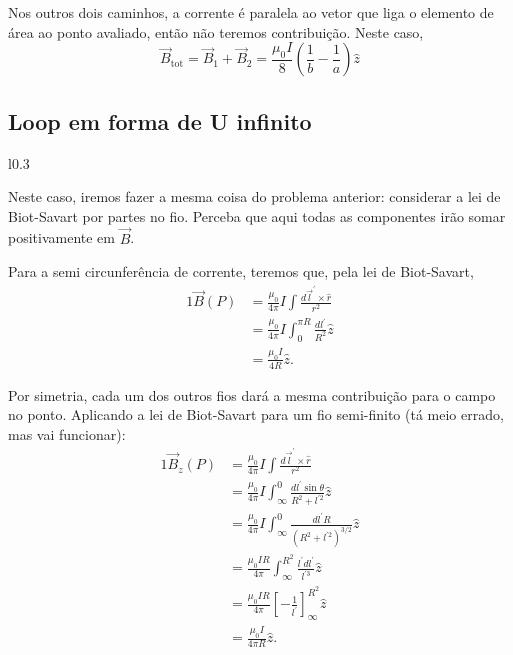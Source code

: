 \documentclass{article}
\newcommand{\rcaligrafico}{r}
\begin{document}
Nos outros dois caminhos, a corrente é paralela ao vetor que liga o elemento de área ao ponto avaliado, então não teremos contribuição. Neste caso,
\begin{equation}
 \vec{B}_{\mathrm{tot}} = \vec{B}_1 + \vec{B}_2 = \frac{\mu_0 I}{8}\left( \frac{1}{b} - \frac{1}{a} \right) \hat{z}
\end{equation}

\subsection{Loop em forma de U infinito}
\begin{wrapfigure}[7]{l}{0.3\textwidth}
\end{wrapfigure}
Neste caso, iremos fazer a mesma coisa do problema anterior: considerar a lei de Biot-Savart por partes no fio. Perceba que aqui todas as componentes irão somar
positivamente em $\vec{B}$.

Para a semi circunferência de corrente, teremos que, pela lei de Biot-Savart,
\begin{alignat}{1}
 \vec{B}(P) &= \frac{\mu_0}{4\pi} I \int \frac{d\vec{l}^{\prime} \times \hat{\rcaligrafico}}{\rcaligrafico^2}\\
 &= \frac{\mu_0}{4\pi} I \int_{0}^{\pi R} \frac{dl^{\prime}}{R^2} \hat{z}\\
 &= \frac{\mu_0 I}{4R}\hat{z}.
\end{alignat}

Por simetria, cada um dos outros fios dará a mesma contribuição para o campo no ponto. Aplicando a lei de Biot-Savart para um fio semi-finito
(tá meio errado, mas vai funcionar):
\begin{alignat}{1}
 \vec{B}_z(P) &= \frac{\mu_0}{4\pi} I \int \frac{d\vec{l}^{\prime} \times \hat{\rcaligrafico}}{\rcaligrafico^2}\\
 &= \frac{\mu_0}{4\pi} I \int_{\infty}^{0} \frac{dl^{\prime} \sin{\theta}}{R^2 + l^{\prime 2}} \hat{z}\\
 &= \frac{\mu_0}{4\pi} I \int_{\infty}^{0} \frac{dl^{\prime} R}{\left(R^2 + l^{\prime 2}\right)^{3 \slash 2}} \hat{z}\\
 &= \frac{\mu_0 I R}{4\pi} \int_{\infty}^{R^2} \frac{l^{\prime}dl^{\prime}}{l^{\prime 3}} \hat{z}\\
 &= \frac{\mu_0 I R}{4\pi} \left[- \frac{1}{l^{\prime}} \right]_{\infty}^{R^2}\hat{z}\\
 &= \frac{\mu_0 I}{4\pi R}\hat{z}.
\end{alignat}
\end{document}

